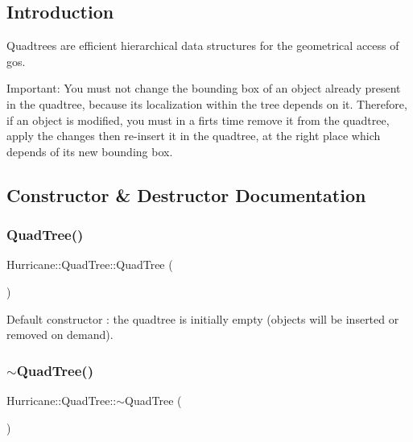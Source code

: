 \hypertarget{classHurricane_1_1QuadTree_secQuadTreeIntro}{}\subsection{Introduction}\label{classHurricane_1_1QuadTree_secQuadTreeIntro}
Quadtrees are efficient hierarchical data structures for the geometrical access of gos.

\begin{DoxyParagraph}{Important\+: You must not change the bounding box of an object already }
present in the quadtree, because its localization within the tree depends on it. Therefore, if an object is modified, you must in a firts time remove it from the quadtree, apply the changes then re-\/insert it in the quadtree, at the right place which depends of its new bounding box. 
\end{DoxyParagraph}


\subsection{Constructor \& Destructor Documentation}
\mbox{\label{classHurricane_1_1QuadTree_a91303ebe7740d87429c74205181ac702}} 
\subsubsection{\texorpdfstring{Quad\+Tree()}{QuadTree()}}
{\footnotesize\ttfamily Hurricane\+::\+Quad\+Tree\+::\+Quad\+Tree (\begin{DoxyParamCaption}{ }\end{DoxyParamCaption})}

Default constructor \+: the quadtree is initially empty (objects will be inserted or removed on demand). \mbox{\label{classHurricane_1_1QuadTree_a3f0c6d7849185a9881bdb3b022fe1777}} 
\subsubsection{\texorpdfstring{$\sim$\+Quad\+Tree()}{~QuadTree()}}
{\footnotesize\ttfamily Hurricane\+::\+Quad\+Tree\+::$\sim$\+Quad\+Tree (\begin{DoxyParamCaption}{ }\end{DoxyParamCaption})}

